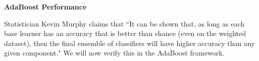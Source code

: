 \item {} {\bf AdaBoost Performance}

Statistician Kevin Murphy claims that ``It can be shown that, as long as each base learner has an accuracy that is better than chance (even on the weighted dataset), then the final ensemble of classifiers will have higher accuracy than any given component." We will now verify this in the AdaBoost framework.


\begin{enumerate}
    
    
	\ifnum{} {
	
        } \fi
        
    
    
	\ifnum{} {
	
        } \fi
        
    
    
	\ifnum{} {
	
        } \fi
        
\end{enumerate}

